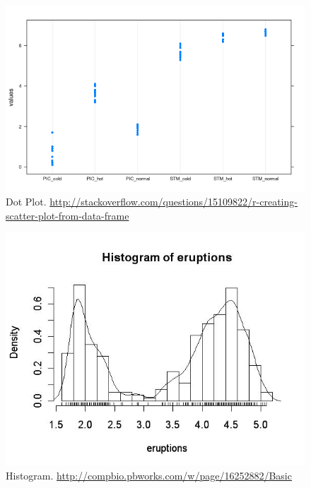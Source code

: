  
\begin{figure}[h]
\centering
\includegraphics[height=0.3\textheight]{art/lmCm0}
\caption[Dot Plot]{Dot Plot. \newline \url{http://stackoverflow.com/questions/15109822/r-creating-scatter-plot-from-data-frame}}
\label{fig:dot_plot}
\end{figure}



\begin{figure}[h]
\centering
\includegraphics[height=0.3\textheight]{art/histogram_eruptions}
\caption[Histogram]{Histogram. \newline
\url{http://compbio.pbworks.com/w/page/16252882/Basic}}
\label{fig:histogram_eruptions}
\end{figure}

